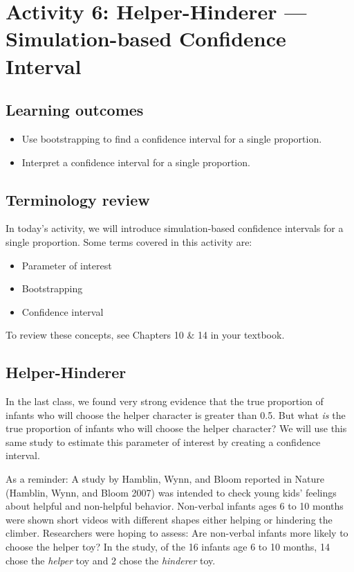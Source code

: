 \documentclass[
]{report}
\begin{document}
\section{Activity 6: Helper-Hinderer --- Simulation-based Confidence Interval}\label{activity-6-helper-hinderer-simulation-based-confidence-interval}


\subsection{Learning outcomes}\label{learning-outcomes-5}

\begin{itemize}
\item
  Use bootstrapping to find a confidence interval for a single proportion.
\item
  Interpret a confidence interval for a single proportion.
\end{itemize}

\subsection{Terminology review}\label{terminology-review-4}

In today's activity, we will introduce simulation-based confidence intervals for a single proportion. Some terms covered in this activity are:

\begin{itemize}
\item
  Parameter of interest
\item
  Bootstrapping
\item
  Confidence interval
\end{itemize}

To review these concepts, see Chapters 10 \& 14 in your textbook.

\subsection{Helper-Hinderer}\label{helper-hinderer-2}

In the last class, we found very strong evidence that the true proportion of infants who will choose the helper character is greater than 0.5. But what \emph{is} the true proportion of infants who will choose the helper character? We will use this same study to estimate this parameter of interest by creating a confidence interval.

As a reminder: A study by Hamblin, Wynn, and Bloom reported in Nature (Hamblin, Wynn, and Bloom 2007) was intended to check young kids' feelings about helpful and non-helpful behavior. Non-verbal infants ages 6 to 10 months were shown short videos with different shapes either helping or hindering the climber. Researchers were hoping to assess: Are non-verbal infants more likely to choose the helper toy? In the study, of the 16 infants age 6 to 10 months, 14 chose the \emph{helper} toy and 2 chose the \emph{hinderer} toy.
\end{document}
